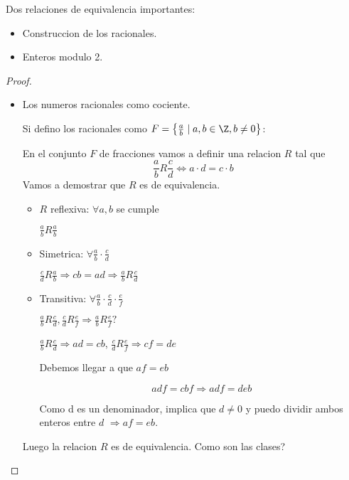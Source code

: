 \begin{example}
	Dos relaciones de equivalencia importantes:
	\begin{itemize}
		\item Construccion de los racionales.
		\item Enteros modulo 2.
	\end{itemize}
\end{example}
\begin{proof}
	\begin{itemize}
		~ \item Los numeros racionales como cociente.

		      Si defino los racionales como \(F = \left\{\frac{a}{b} \mid a,b \in \Z, b \neq 0\right\}\):

		      En el conjunto \(F \) de fracciones vamos a definir una relacion \(R \) tal que
		      \[
			      \frac{a}{b }R \frac{c}{d} \iff a \cdot d = c \cdot b
		      \]
		      Vamos a demostrar que \(R \) es de equivalencia.
		      \begin{itemize}
			      \item \(R \) reflexiva: \(\forall a,b \) se cumple

			            \(\frac{a}{b}R \frac{a}{b } \)

			      \item Simetrica: \(\forall \frac{a}{b } \cdot \frac{c}{d } \)

			            \(\frac{c}{d}R \frac{a}{b} \Rightarrow cb = ad \Rightarrow \frac{a}{b}R \frac{c}{d} \)

			      \item Transitiva: \(\forall  \frac{a}{b} \cdot \frac{c}{d} \cdot \frac{e}{f }\)

			            \(\frac{a}{b} R \frac{c}{d}, \frac{c}{d}R \frac{e}{f} \Rightarrow \frac{a}{b}R \frac{e}{f}?\)

			            \(\frac{a}{b}R \frac{c}{d} \Rightarrow ad = cb \), \(\frac{c}{d} R \frac{e}{f} \Rightarrow cf = de\)

			            Debemos llegar a que \(af = eb \)

			            \begin{equation*}
				            adf = cbf \Rightarrow adf = deb
			            \end{equation*}

			            Como d es un denominador, implica que \(d \neq  0 \) y puedo dividir ambos enteros entre \(d \) \(\Rightarrow af = eb\).

		      \end{itemize}
		      Luego la relacion \(R \) es de equivalencia. Como son las clases?


\end{itemize}
\end{proof}
